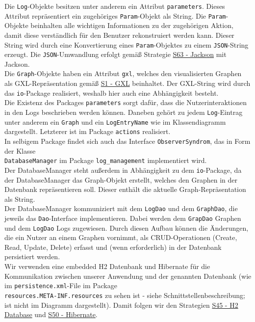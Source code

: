 \documentclass[enabledeprecatedfontcommands,fontsize=11pt,paper=a4,twoside]{scrartcl}
\newcounter{one}
\begin{document}
Die \texttt{Log}-Objekte besitzen unter anderem ein Attribut \texttt{parameters}. Dieses Attribut repräsentiert ein zugehöriges \texttt{Param}-Objekt als String. Die \texttt{Param}-Objekte beinhalten alle wichtigen Informationen zu der zugehörigen Aktion, damit diese verständlich für den Benutzer rekonstruiert werden kann. Dieser String wird durch eine Konvertierung eines \texttt{Param}-Objektes zu einem \texttt{JSON}-String erzeugt. Die \texttt{JSON}-Umwandlung erfolgt gemäß Strategie \hyperlink{www}{S63 - Jackson} mit Jackson. \\

Die \texttt{Graph}-Objekte haben ein Attribut \texttt{gxl}, welches den visualisierten Graphen als GXL-Repräsentation gemäß \hyperlink{yy}{S1 - GXL} beinhaltet. Der GXL-String wird durch das \texttt{io}-Package realisiert, weshalb hier auch eine Abhängigkeit besteht.\\

Die Existenz des Packages \texttt{parameters} sorgt dafür, dass die Nutzerinteraktionen in den Logs beschrieben werden können. Daneben gehört zu jedem \texttt{Log}-Eintrag unter anderem ein \texttt{Graph} und ein \texttt{LogEntryName} wie im Klassendiagramm dargestellt. Letzterer ist im Package \texttt{actions} realisiert. \\

In selbigem Package findet sich auch das Interface \texttt{ObserverSyndrom}, das in Form der Klasse\\ \texttt{DatabaseManager} im Package \texttt{log\_management} implementiert wird. \\
Der DatabaseManager steht außerdem in Abhängigkeit zu dem \texttt{io}-Package, da der DatabaseManager das Graph-Objekt erstellt, welches den Graphen in der Datenbank repräsentieren soll. Dieser enthält die aktuelle Graph-Repräsentation als String. \\
Der DatabaseManager kommuniziert mit dem \texttt{LogDao} und dem \texttt{GraphDao}, die jeweils das \texttt{Dao}-Interface implementieren. Dabei werden dem \texttt{GrapDao} Graphen und dem \texttt{LogDao} Logs zugewiesen. Durch diesen Aufbau können die Änderungen, die ein Nutzer an einem Graphen vornimmt, als CRUD-Operationen (Create, Read, Update, Delete) erfasst und (wenn erforderlich) in der Datenbank persistiert werden. \\ 

Wir verwenden eine embedded H2 Datenbank und Hibernate für die Kommunikation zwischen unserer Anwendung und der genannten Datenbank (wie im \texttt{persistence.xml}-File im Package\\ \texttt{resources.META-INF.resources} zu sehen ist - siehe Schnittstellenbeschreibung; ist nicht im Diagramm dargestellt). Damit folgen wir den Strategien \hyperlink{ppp}{S45 - H2 Database} und \hyperlink{rrr}{S50 - Hibernate}. \\
\end{document}
